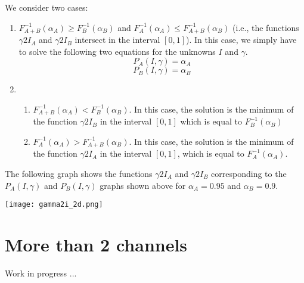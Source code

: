 \documentclass[11pt]{article}   	%
\begin{document}
We consider two cases:

\begin{enumerate}
\item $F_{A+B}^{-1}(\alpha_A) \geq F_B^{-1}(\alpha_B)$ and $F_A^{-1}(\alpha_A) \leq F_{A+B}^{-1}(\alpha_B)$ (i.e., the functions $\gamma 2I_A$ and $\gamma 2I_B$ intersect in the interval $[0,1]$). In this case, we simply have to solve the following two equations for the unknowns $I$ and $\gamma$. 
$$P_A(I, \gamma) = \alpha_A$$
$$P_B(I, \gamma) = \alpha_B$$
\item
\begin{enumerate}
\item $F_{A+B}^{-1}(\alpha_A) < F_B^{-1}(\alpha_B)$. In this case, the solution is the minimum of the function $\gamma 2I_B$ in the interval $[0,1]$ which is equal to $F_B^{-1}(\alpha_B)$
\item $F_A^{-1}(\alpha_A) > F_{A+B}^{-1}(\alpha_B)$. In this case, the solution is the minimum of the function $\gamma 2I_A$ in the interval $[0,1]$, which is equal to $F_A^{-1}(\alpha_A)$.
\end{enumerate}
\end{enumerate}

The following graph shows the functions $\gamma 2I_A$ and $\gamma2I_B$ corresponding to the $P_A(I, \gamma)$ and $P_B(I, \gamma)$ graphs shown above for $\alpha_A = 0.95$ and $\alpha_B = 0.9$.

\texttt{[image: gamma2i\_2d.png]}

\section{More than 2 channels}

Work in progress ...
\end{document}
